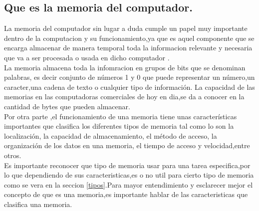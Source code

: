 \documentclass{article}
\begin{document}
\subsection{Que es la memoria del computador.} \label{contenido}
La memoria del computador sin lugar a duda cumple un papel muy importante dentro de la computacion y su funcionamiento,ya que es aquel componente que se encarga almacenar de manera temporal toda la informacion relevante y necesaria que va a ser procesada o usada en dicho computador \cite{augusto}.\\

La memoria almacena toda la infomracion en grupos de bits que se denominan palabras, es decir conjunto de números 1 y 0 que puede representar un número,un caracter,una cadena de texto o cualquier tipo de  información. La capacidad de las memorias en las computadoras comerciales de hoy en dia,se da a conocer en la cantidad de  bytes que pueden almacenar.\cite{arquitectura}\\

Por otra parte ,el funcionamiento de una memoria tiene unas características importantes que clasifica los
diferentes tipos de memoria tal como lo son la localización, la capacidad de almacenamiento, el método de acceso, la organización de los datos en una memoria, el tiempo de acceso y velocidad,entre otros.\\

Es importante reconocer que tipo de memoria usar para una tarea especifica,por lo que dependiendo de sus caracteristicas,es o no util para cierto tipo de memoria como se vera en la seccion \ref{tipos}.Para mayor entendimiento y esclarecer mejor el concepto de que es una memoria,es importante hablar de las caracteristicas que clasifica una memoria.
\end{document}
